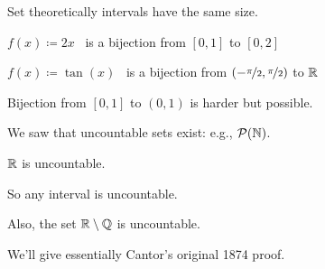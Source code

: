 \documentclass[10pt,aspectratio=169]{beamer}
\begin{document}
\begin{frame}
Set theoretically intervals have the same size.

\medskip
\pause

$f(x)\coloneqq 2x$ ~is a bijection from $[0,1]$ to $[0,2]$

\medskip
\pause

$f(x) \coloneqq \tan(x)$ ~is a bijection from $(-\nicefrac{\pi}{2},\nicefrac{\pi}{2})$ to ${\mathbb{R}}$

\medskip
\pause

Bijection from $[0,1]$ to $(0,1)$ is harder but possible.

\medskip
\pause

We saw that uncountable sets exist: e.g., ${\mathcal{P}}({\mathbb{N}})$.

\pause

\begin{theorem}[Cantor]
${\mathbb{R}}$ is uncountable.
\end{theorem}

\pause

So any interval is uncountable.

\medskip
\pause

Also, the set ${\mathbb{R}} \setminus {\mathbb{Q}}$ is uncountable.

\medskip
\pause

We'll give essentially Cantor's original 1874 proof.

\end{frame}
\end{document}
